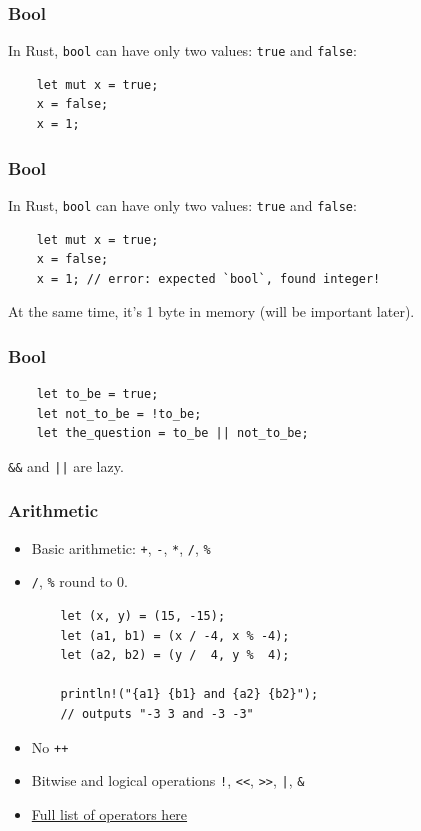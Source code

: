 \documentclass[aspectratio=1610,t]{beamer}
\begin{document}

\begin{frame}[fragile]
\frametitle{Bool}

In Rust, \texttt{bool} can have only two values: \texttt{true} and \texttt{false}:

\begin{verbatim}
    let mut x = true;
    x = false;
    x = 1; 
\end{verbatim}

\end{frame}


\begin{frame}[fragile]
\frametitle{Bool}

In Rust, \texttt{bool} can have only two values: \texttt{true} and \texttt{false}:

\begin{verbatim}
    let mut x = true;
    x = false;
    x = 1; // error: expected `bool`, found integer!
\end{verbatim}

At the same time, it's 1 byte in memory (will be important later).

\end{frame}


\begin{frame}[fragile]
\frametitle{Bool}
\begin{verbatim}
    let to_be = true;
    let not_to_be = !to_be;
    let the_question = to_be || not_to_be;
\end{verbatim}

\texttt{\&\&} and \texttt{||} are lazy.
\end{frame}


\begin{frame}[fragile]
\frametitle{Arithmetic}
\begin{itemize}
    \item Basic arithmetic: \texttt{+}, \texttt{-}, \texttt{*}, \texttt{/}, \texttt{\%}
    \item \texttt{/}, \texttt{\%} round to 0.
\begin{verbatim}
    let (x, y) = (15, -15);
    let (a1, b1) = (x / -4, x % -4);
    let (a2, b2) = (y /  4, y %  4);

    println!("{a1} {b1} and {a2} {b2}");
    // outputs "-3 3 and -3 -3"
\end{verbatim}
    \item No \texttt{++}
    \item Bitwise and logical operations \texttt{!}, \texttt{<<}, \texttt{>>}, \texttt{|}, \texttt{\&}
    \item \href{https://doc.rust-lang.org/book/appendix-02-operators.html}{Full list of operators here}
\end{itemize}
\end{frame}
\end{document}
